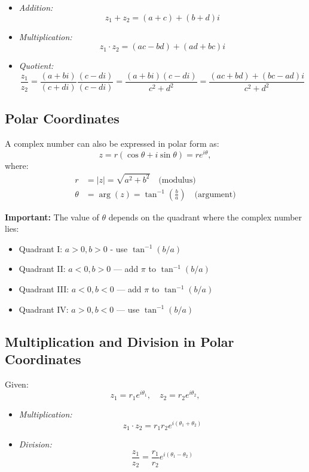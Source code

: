 \begin{itemize}[label=\(-\)]
	\item \emph{Addition:}
	      \[
		      z_1 + z_2 = (a + c) + (b + d)i
	      \]

	\item \emph{Multiplication:}
	      \[
		      z_1 \cdot z_2 = (ac - bd) + (ad + bc)i
	      \]

	\item \emph{Quotient:}
	      \[
		      \frac{z_1}{z_2} = \frac{(a + bi)}{(c + di)} \frac{(c - di)}{(c - di)} = \frac{(a + bi)(c - di)}{c^2 + d^2} = \frac{(ac + bd) + (bc - ad)i}{c^2 + d^2}
	      \]
\end{itemize}

\subsection{Polar Coordinates}

A complex number can also be expressed in polar form as:
\[
	z = r(\cos \theta + i \sin \theta) = re^{i\theta},
\]
where:
\begin{align*}
	r      & = |z| = \sqrt{a^2 + b^2} \quad \text{(modulus)}                       \\
	\theta & = \arg(z) = \tan^{-1}\left(\frac{b}{a}\right) \quad \text{(argument)}
\end{align*}

\textbf{Important:} The value of \( \theta \) depends on the quadrant where the complex number lies:

\begin{itemize}[label=\(-\)]
	\item Quadrant I: \( a > 0, b > 0 \) - use \( \tan^{-1}(b/a) \)
	\item Quadrant II: \( a < 0, b > 0 \) — add \( \pi \) to \( \tan^{-1}(b/a) \)
	\item Quadrant III: \( a < 0, b < 0 \) — add \( \pi \) to \( \tan^{-1}(b/a) \)
	\item Quadrant IV: \( a > 0, b < 0 \) — use \( \tan^{-1}(b/a) \)
\end{itemize}

\subsection{Multiplication and Division in Polar Coordinates}

Given:
\[
	z_1 = r_1 e^{i\theta_1}, \quad z_2 = r_2 e^{i\theta_2},
\]

\begin{itemize}[label=\(-\)]
	\item \emph{Multiplication:}
	      \[
		      z_1 \cdot z_2 = r_1 r_2 e^{i(\theta_1 + \theta_2)}
	      \]

	\item \emph{Division:}
	      \[
		      \frac{z_1}{z_2} = \frac{r_1}{r_2} e^{i(\theta_1 - \theta_2)}
	      \]
\end{itemize}

